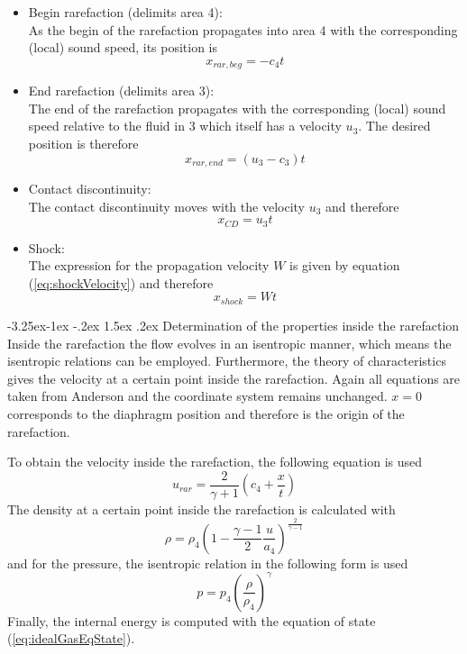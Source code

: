 \documentclass[11pt,a4paper,twoside]{report}
\makeatletter
\renewcommand\paragraph{\@startsection{paragraph}{4}{\z@}%
  {-3.25ex\@plus -1ex \@minus -.2ex}%
  {1.5ex \@plus .2ex}%
  {\normalfont\normalsize\bfseries}}
\makeatother
\begin{document}
\begin{itemize} 

  \item Begin rarefaction (delimits area 4): \\
As the begin of the rarefaction propagates into area 4 with the corresponding (local) sound speed, its position is 
\begin{equation}
 x_{rar,beg}=-c_4 t
\end{equation}

  \item End rarefaction (delimits area 3): \\
The end of the rarefaction propagates with the corresponding (local) sound speed relative to the fluid in 3 which itself has a velocity $u_3$. The desired position is therefore
\begin{equation}
 x_{rar,end}=(u_3-c_3) t
\end{equation}

  \item Contact discontinuity: \\
The contact discontinuity moves with the velocity $u_3$ and therefore
\begin{equation}
 x_{CD}=u_3 t
\end{equation}

  \item Shock: \\
  The expression for the propagation velocity $W$ is given by equation (\ref{eq:shockVelocity}) and therefore
\begin{equation}
 x_{shock}=W t
\end{equation}

\end{itemize}

\paragraph{Determination of the properties inside the rarefaction}
Inside the rarefaction the flow evolves in an isentropic manner, which means the isentropic relations can be employed. Furthermore, the theory of characteristics gives the velocity at a certain point inside the rarefaction. Again all equations are taken from Anderson \cite{Anderson2002} and the coordinate system remains unchanged. $x=0$ corresponds to the diaphragm position and therefore is the origin of the rarefaction.

To obtain the velocity inside the rarefaction, the following equation is used
\begin{equation}
 u_{rar}=\frac{2}{\gamma+1}\left(c_4+\frac{x}{t}\right)
\end{equation}
\noindent
The density at a certain point inside the rarefaction is calculated with
\begin{equation}
\rho=\rho_4 \left(1-\frac{\gamma-1}{2}\frac{u}{a_4}\right)^\frac{2}{\gamma-1}
\end{equation}
and for the pressure, the isentropic relation in the following form is used
\begin{equation}
p=p_4\left(\frac{\rho}{\rho_4}\right)^\gamma
\end{equation}
Finally, the internal energy is computed with the equation of state (\ref{eq:idealGasEqState}).
\end{document}
